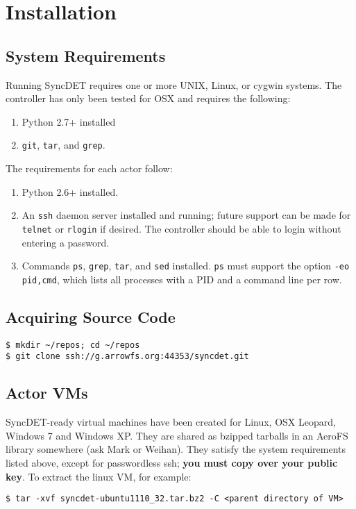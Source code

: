 \section{Installation}

\subsection{System Requirements}

Running SyncDET requires one or more UNIX, Linux, or cygwin systems. 
The controller has only been tested for OSX and requires the
following:
\begin{enumerate}
\item Python 2.7+ installed
\item {\tt git}, {\tt tar}, and {\tt grep}.
\end{enumerate}
The requirements for each actor follow:
\begin{enumerate}
\item Python 2.6+ installed.
\item An {\tt ssh} daemon server installed and running; future support can be made for
{\tt telnet} or {\tt rlogin} if desired. The controller should be able to login
without entering a password.
\item Commands {\tt ps}, {\tt grep}, {\tt tar}, and {\tt sed} installed. {\tt ps} must
support the option {\tt -eo pid,cmd}, which lists all processes with a PID and a
command line per row.
\end{enumerate}

\subsection{Acquiring Source Code}
\begin{verbatim}
$ mkdir ~/repos; cd ~/repos
$ git clone ssh://g.arrowfs.org:44353/syncdet.git
\end{verbatim}

\subsection{Actor VMs}
SyncDET-ready virtual machines have been created for Linux, OSX Leopard, Windows
7 and Windows XP. They are shared as bzipped tarballs in an AeroFS library
somewhere (ask Mark or Weihan). They satisfy the system requirements listed
above, except for passwordless ssh; {\bf you must copy over your public key}. To
extract the linux VM, for example:
\begin{verbatim}
$ tar -xvf syncdet-ubuntu1110_32.tar.bz2 -C <parent directory of VM>
\end{verbatim}

